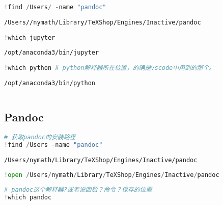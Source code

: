 \documentclass[
]{article}
\begin{document}
\hypertarget{296a8c95}{}
\begin{lstlisting}[language=Python]
!find /Users/ -name "pandoc"
\end{lstlisting}

\begin{lstlisting}
/Users//nymath/Library/TeXShop/Engines/Inactive/pandoc
\end{lstlisting}

\hypertarget{87591abe}{}
\begin{lstlisting}[language=Python]
!which jupyter
\end{lstlisting}

\begin{lstlisting}
/opt/anaconda3/bin/jupyter
\end{lstlisting}

\hypertarget{291f956f}{}
\begin{lstlisting}[language=Python]
!which python # python解释器所在位置，的确是vscode中用到的那个。
\end{lstlisting}

\begin{lstlisting}
/opt/anaconda3/bin/python
\end{lstlisting}

\hypertarget{ffb615b4}{}
\begin{lstlisting}[language=Python]
\end{lstlisting}

\hypertarget{74eb307f}{}
\hypertarget{pandoc}{%
\subsection{Pandoc}\label{pandoc}}

\hypertarget{db8aa717}{}
\begin{lstlisting}[language=Python]
# 获取pandoc的安装路径
!find /Users -name "pandoc"
\end{lstlisting}

\begin{lstlisting}
/Users/nymath/Library/TeXShop/Engines/Inactive/pandoc
\end{lstlisting}

\hypertarget{9e039552}{}
\begin{lstlisting}[language=Python]
!open /Users/nymath/Library/TeXShop/Engines/Inactive/pandoc
\end{lstlisting}

\hypertarget{1fe0e645}{}
\begin{lstlisting}[language=Python]
# pandoc这个解释器?或者说函数？命令？保存的位置
!which pandoc
\end{lstlisting}
\end{document}
